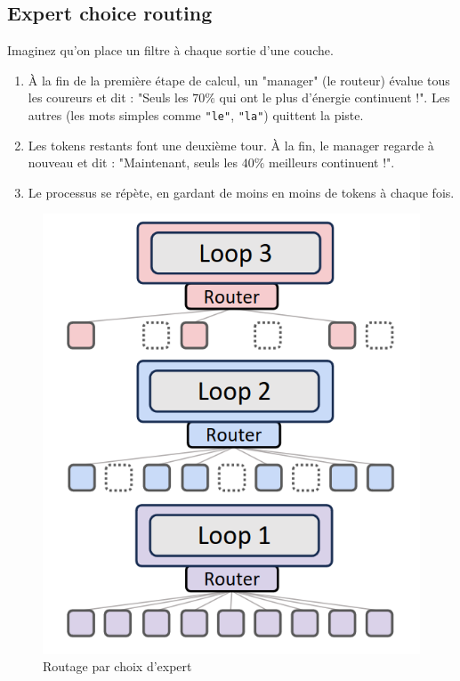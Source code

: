 \documentclass{article}
\begin{document}
\subsection{Expert choice routing}
Imaginez qu'on place un filtre à chaque sortie d'une couche.

\begin{enumerate}
  \item À la fin de la première étape de calcul, un "manager" (le routeur)
  évalue tous les coureurs et dit : "Seuls les $70\%$ qui ont le plus d'énergie
  continuent !". Les autres (les mots simples comme \texttt{"le"},
  \texttt{"la"}) quittent la piste.
  
  \item Les tokens restants font une deuxième tour. À la fin, le manager
  regarde à nouveau et dit : "Maintenant, seuls les $40\%$ meilleurs
  continuent !".

  \item Le processus se répète, en gardant de moins en moins de tokens
  à chaque fois.
\end{enumerate}

\begin{figure}[h]
  \centering
  \includegraphics[scale=0.4]{images/expert_choice_routing.png}
  \caption{Routage par choix d'expert \cite{bae2025mixtureofrecursionslearningdynamicrecursive}}
  \label{fig:expert-choice-routing}
\end{figure}
\end{document}
